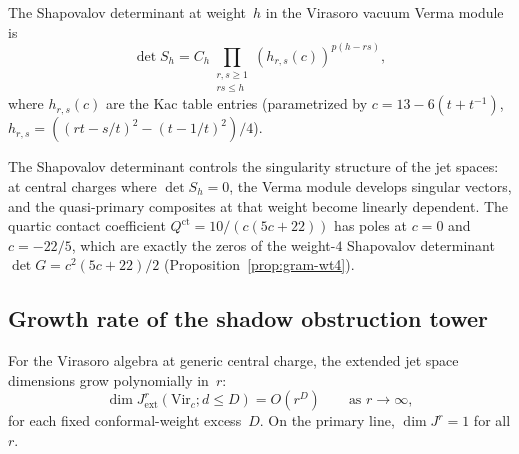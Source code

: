 \begin{remark}
\label{rem:shapovalov-jet}
The Shapovalov determinant at weight~$h$ in the Virasoro
vacuum Verma module is
\begin{equation}\label{eq:shapovalov-virasoro}
\det S_h = C_h \prod_{\substack{r,s \geq 1 \\ rs \leq h}}
(h_{r,s}(c))^{p(h-rs)},
\end{equation}
where $h_{r,s}(c)$ are the Kac table entries
(parametrized by
$c = 13 - 6(t + t^{-1})$, $h_{r,s} =
((rt - s/t)^2 - (t - 1/t)^2)/4$).

The Shapovalov determinant controls the singularity
structure of the jet spaces: at central charges where
$\det S_h = 0$, the Verma module develops singular
vectors, and the quasi-primary composites at that weight
become linearly dependent. The quartic contact
coefficient $Q^{\mathrm{ct}} = 10/(c(5c+22))$ has
poles at $c = 0$ and $c = -22/5$, which are exactly
the zeros of the weight-$4$ Shapovalov determinant
$\det G = c^2(5c+22)/2$
(Proposition~\ref{prop:gram-wt4}).
\end{remark}


\subsection{Growth rate of the shadow obstruction tower}
\label{subsec:growth-rate}

\begin{theorem}
\label{thm:jet-space-polynomial-growth}
For the Virasoro algebra at generic central charge,
the extended jet space dimensions grow
polynomially in~$r$:
\begin{equation}\label{eq:jet-polynomial-growth}
\dim J^r_{\mathrm{ext}}(\mathrm{Vir}_c; d \leq D)
= O(r^D)
\qquad \text{as } r \to \infty,
\end{equation}
for each fixed conformal-weight excess~$D$.
On the primary line, $\dim J^r = 1$ for all $r$.
\end{theorem}

